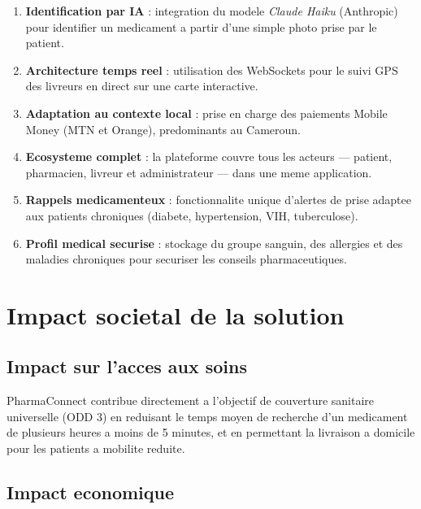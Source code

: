\documentclass[12pt,a4paper]{report}
\begin{document}
\begin{enumerate}[label=\textcolor{vertpharma}{\arabic*.},leftmargin=*]
    \item \textbf{Identification par IA} : integration du modele \textit{Claude Haiku} (Anthropic) pour identifier un medicament a partir d'une simple photo prise par le patient.

    \item \textbf{Architecture temps reel} : utilisation des WebSockets pour le suivi GPS des livreurs en direct sur une carte interactive.

    \item \textbf{Adaptation au contexte local} : prise en charge des paiements Mobile Money (MTN et Orange), predominants au Cameroun.

    \item \textbf{Ecosysteme complet} : la plateforme couvre tous les acteurs --- patient, pharmacien, livreur et administrateur --- dans une meme application.

    \item \textbf{Rappels medicamenteux} : fonctionnalite unique d'alertes de prise adaptee aux patients chroniques (diabete, hypertension, VIH, tuberculose).

    \item \textbf{Profil medical securise} : stockage du groupe sanguin, des allergies et des maladies chroniques pour securiser les conseils pharmaceutiques.
\end{enumerate}

\section{Impact societal de la solution}

\subsection{Impact sur l'acces aux soins}

PharmaConnect contribue directement a l'objectif de couverture sanitaire universelle (ODD 3) en reduisant le temps moyen de recherche d'un medicament de plusieurs heures a moins de 5 minutes, et en permettant la livraison a domicile pour les patients a mobilite reduite.

\subsection{Impact economique}
\end{document}
